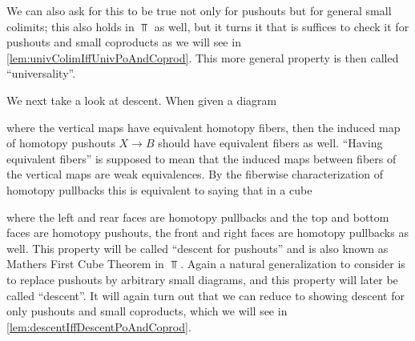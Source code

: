 We can also ask for this to be true not only for pushouts but for general small colimits; 
this also  holds in $\Top$ as well, but it turns it that is suffices to check it for pushouts and small coproducts as we will see in \cref{lem:univColimIffUnivPoAndCoprod}.
This more general property is then called ``universality''.

We next take a look at descent.
When given a diagram 
\begin{center}
\end{center}
where the vertical maps have equivalent homotopy fibers, then the induced map of homotopy pushouts $X\to B$ should have equivalent fibers as well.
``Having equivalent fibers'' is supposed to mean that the induced maps between fibers of the vertical maps are weak equivalences.
By the fiberwise characterization of homotopy pullbacks this is equivalent to saying that in a cube 
\begin{center}
\end{center}
where the left and rear faces are homotopy pullbacks and the top and bottom faces are homotopy pushouts, the front and right faces are homotopy pullbacks as well.
This property will be called ``descent for pushouts'' and is also known as Mathers First Cube Theorem in $\Top$.
Again a natural generalization to consider is to replace pushouts by arbitrary small diagrams, and this property will later be called ``descent''.
It will again turn out that we can reduce to showing descent for only pushouts and small coproducts, which we will see in \cref{lem:descentIffDescentPoAndCoprod}.